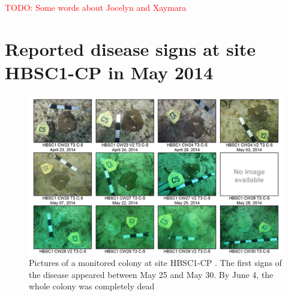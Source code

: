 \documentclass[preprint,12pt,authoryear]{elsarticle}
\newcommand{\todo}[1]{\textcolor{red}{TODO: #1}}
\begin{document}
\todo{Some words about Jocelyn and Xaymara}

 

\newpage
\appendix
\section{Reported disease signs at site HBSC1-CP in May 2014}\label{onset:appendice}
\begin{figure}[h!]
	\centering
	\includegraphics[width=\textwidth]{figures/hbsc1_cp.png}
	\caption{Pictures of a monitored colony at site HBSC1-CP \citep{dial2015}. The first signs of the disease appeared between May 25 and May 30. By June 4, the whole colony was completely dead}
\end{figure}
\end{document}

